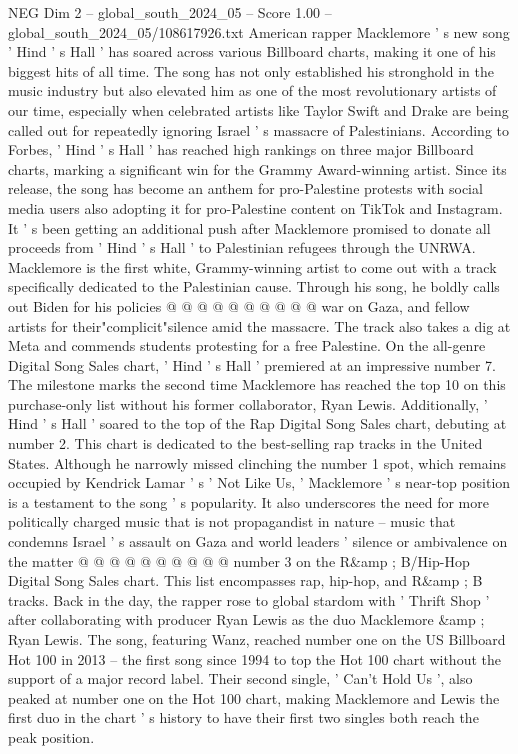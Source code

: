 \begin{textsample}{NEG Dim 2 – global\_south\_2024\_05 – Score 1.00 – global\_south\_2024\_05/108617926.txt}  \label{ex:f2_neg_370}
American rapper Macklemore ' s new song ' Hind ' s Hall ' has soared across various Billboard charts, making it one of his biggest hits of all time.
The song has not only established his stronghold in the music industry but also elevated him as one of the most revolutionary artists of our time, especially when celebrated artists like Taylor Swift and Drake are being called out for repeatedly ignoring Israel ' s massacre of Palestinians.
According to Forbes, ' Hind ' s Hall ' has reached high rankings on three major Billboard charts, marking a significant win for the Grammy Award-winning artist.
Since its release, the song has become an anthem for pro-Palestine protests with social media users also adopting it for pro-Palestine content on TikTok and Instagram.
It ' s been getting an additional push after Macklemore promised to donate all proceeds from ' Hind ' s Hall ' to Palestinian refugees through the UNRWA.
Macklemore is the first white, Grammy-winning artist to come out with a track specifically dedicated to the Palestinian cause.
Through his song, he boldly calls out Biden for his policies @ @ @ @ @ @ @ @ @ @ war on Gaza, and fellow artists for their"complicit"silence amid the massacre.
The track also takes a dig at Meta and commends students protesting for a free Palestine.
On the all-genre Digital Song Sales chart, ' Hind ' s Hall ' premiered at an impressive number 7.
The milestone marks the second time Macklemore has reached the top 10 on this purchase-only list without his former collaborator, Ryan Lewis.
Additionally, ' Hind ' s Hall ' soared to the top of the Rap Digital Song Sales chart, debuting at number 2.
This chart is dedicated to the best-selling rap tracks in the United States.
Although he narrowly missed clinching the number 1 spot, which remains occupied by Kendrick Lamar ' s ' Not Like Us, ' Macklemore ' s near-top position is a testament to the song ' s popularity.
It also underscores the need for more politically charged music that is not propagandist in nature -- music that condemns Israel ' s assault on Gaza and world leaders ' silence or ambivalence on the matter @ @ @ @ @ @ @ @ @ @ number 3 on the R\&amp ; B/Hip-Hop Digital Song Sales chart.
This list encompasses rap, hip-hop, and R\&amp ; B tracks.
Back in the day, the rapper rose to global stardom with ' Thrift Shop ' after collaborating with producer Ryan Lewis as the duo Macklemore \&amp ; Ryan Lewis.
The song, featuring Wanz, reached number one on the US Billboard Hot 100 in 2013 -- the first song since 1994 to top the Hot 100 chart without the support of a major record label.
Their second single, ' Can't Hold Us ', also peaked at number one on the Hot 100 chart, making Macklemore and Lewis the first duo in the chart ' s history to have their first two singles both reach the peak position.

\end{textsample}
